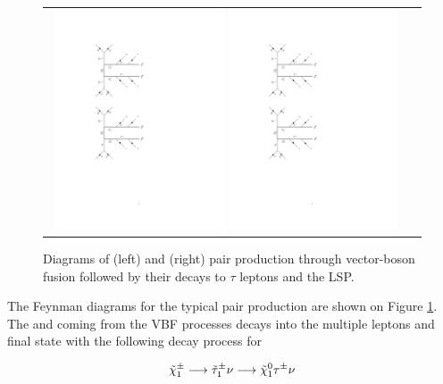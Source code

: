 \begin{figure}[tbh!]
	\centering
	\begin{tabular}{cc}
		\includegraphics[width=0.48\textwidth]{diagrams/pics/signal_C1N2.pdf}
		\includegraphics[width=0.48\textwidth]{diagrams/pics/signal_C1C1.pdf} 		
	\end{tabular}
	\caption{Diagrams of (left) \charginopm \neutralinotwo and (right) \charginopm \charginomp pair production through vector-boson fusion followed by their decays to $\tau$ leptons and the LSP.}
	\label{fig:VBF_diagrams}
\end{figure}

The Feynman diagrams for the typical \charginopm \neutralinotwo pair production are shown on  Figure \ref{fig:VBF_diagrams}. The \charginopm and \neutralinotwo coming from the VBF processes decays into the multiple leptons and \neutralinoone final state with the following decay process for \charginopm

\begin{equation}
\tilde{\chi}^{\pm}_{1} \longrightarrow \tilde{\tau}_{1}^{\pm} \nu \longrightarrow \tilde{\chi}^{0}_{1} \tau^{\pm} \nu
\end{equation}

